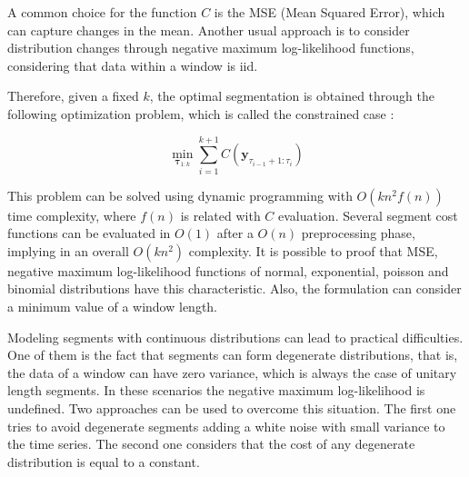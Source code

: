 A common choice for the function $C$ is the MSE (Mean Squared Error), which can capture changes in the mean. Another usual approach is to consider distribution changes through negative maximum log-likelihood functions, considering that data within a window is iid. 

Therefore, given a fixed $k$, the optimal segmentation is obtained through the following optimization problem, which is called the constrained case \cite{on_optimal_multiple_changepoint_algorithms_for_large_data}: 

\begin{equation}
    \min_{\boldsymbol \tau_{1 : k}} \sum \limits_{i = 1}^{k + 1} C(\mathbf{y}_{\tau_{i - 1} + 1 : \tau_{i}})
\end{equation}

This problem can be solved using dynamic programming with $O(k n^2 f(n))$ time complexity, where $f(n)$ is related with $C$ evaluation. Several segment cost functions can be evaluated in $O(1)$ after a $O(n)$ preprocessing phase, implying in an overall $O(k n^2)$ complexity. It is possible to proof that MSE, negative maximum log-likelihood functions of normal, exponential, poisson and binomial distributions have this characteristic. Also, the formulation can consider a minimum value of a window length.

Modeling segments with continuous distributions can lead to practical difficulties. One of them is the fact that segments can form degenerate distributions, that is, the data of a window can have zero variance, which is always the case of unitary length segments. In these scenarios the negative maximum log-likelihood is undefined. Two approaches can be used to overcome this situation. The first one tries to avoid degenerate segments adding a white noise with small variance to the time series. The second one considers that the cost of any degenerate distribution is equal to a constant.




